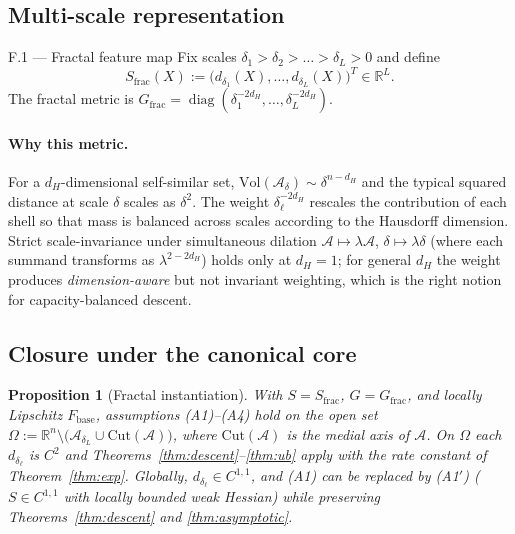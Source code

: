 \documentclass[11pt,oneside]{amsart}
\theoremstyle{plain}
\newtheorem{proposition}[theorem]{Proposition}
\theoremstyle{definition}
\newcommand{\Fbase}{F_{\mathrm{base}}}
\newcommand{\R}{\mathbb{R}}
\DeclareMathOperator{\diag}{diag}
\begin{document}
\subsection{Multi-scale representation}

\begin{defbox}{F.1 --- Fractal feature map}
Fix scales $\delta_{1}>\delta_{2}>\dots>\delta_{L}>0$ and define
\[
  S_{\mathrm{frac}}(X) := \bigl(d_{\delta_{1}}(X),\dots,d_{\delta_{L}}(X)\bigr)^{T}\in\R^{L}.
\]
The fractal metric is
\(
  G_{\mathrm{frac}} = \diag(\delta_{1}^{-2 d_{H}},\dots,\delta_{L}^{-2 d_{H}}).
\)
\end{defbox}

\paragraph{Why this metric.}
For a $d_{H}$-dimensional self-similar set,
$\mathrm{Vol}(\mathcal{A}_{\delta})\sim \delta^{n-d_{H}}$ and the
typical squared distance at scale $\delta$ scales as $\delta^{2}$. The
weight $\delta_{\ell}^{-2 d_{H}}$ rescales the contribution of each
shell so that mass is balanced across scales according to the
Hausdorff dimension. Strict scale-invariance under simultaneous
dilation $\mathcal{A}\mapsto\lambda\mathcal{A}$,
$\delta\mapsto\lambda\delta$ (where each summand transforms as
$\lambda^{2-2 d_{H}}$) holds only at $d_{H}=1$; for general $d_{H}$
the weight produces \emph{dimension-aware} but not invariant
weighting, which is the right notion for capacity-balanced descent.

\subsection{Closure under the canonical core}

\begin{proposition}[Fractal instantiation]
\label{prop:fractal-inst}
With $S=S_{\mathrm{frac}}$, $G=G_{\mathrm{frac}}$, and locally
Lipschitz $\Fbase$, assumptions \textup{(A1)--(A4)} hold on the open
set $\Omega := \R^{n}\setminus\bigl(\mathcal{A}_{\delta_{L}}\cup
\mathrm{Cut}(\mathcal{A})\bigr)$, where $\mathrm{Cut}(\mathcal{A})$
is the medial axis of $\mathcal{A}$. On $\Omega$ each $d_{\delta_{\ell}}$
is $C^{2}$ and Theorems~\ref{thm:descent}--\ref{thm:ub} apply with the
rate constant of Theorem~\ref{thm:exp}. Globally,
$d_{\delta_{\ell}}\in C^{1,1}$, and \textup{(A1)} can be replaced by
\textup{(A1$'$)} ($S\in C^{1,1}$ with locally bounded weak Hessian)
while preserving Theorems~\ref{thm:descent} and \ref{thm:asymptotic}.
\end{proposition}
\end{document}
